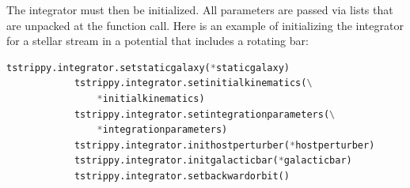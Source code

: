         The integrator must then be initialized. All parameters are passed via lists that are unpacked at the function call. Here is an example of initializing the integrator for a stellar stream in a potential that includes a rotating bar:
        \small
        \begin{lstlisting}[language=python]
            tstrippy.integrator.setstaticgalaxy(*staticgalaxy)
            tstrippy.integrator.setinitialkinematics(\
                *initialkinematics)
            tstrippy.integrator.setintegrationparameters(\
                *integrationparameters)
            tstrippy.integrator.inithostperturber(*hostperturber)
            tstrippy.integrator.initgalacticbar(*galacticbar)
            tstrippy.integrator.setbackwardorbit()
        \end{lstlisting}
        \normalsize

